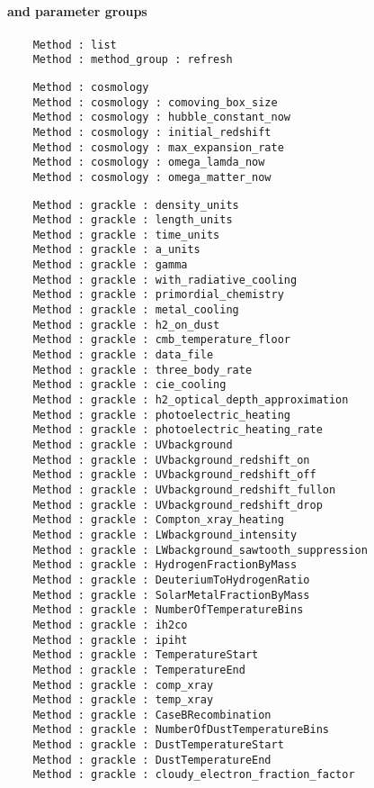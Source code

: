 \NEWSEC

\subsection{\ssParamMethod}

\begin{frame}[fragile,label=ss-param-method] 
\secframetitle{\ssParamMethod}
\framesubtitle{ and  parameter groups}

\begin{verbatim}
    Method : list
    Method : method_group : refresh
\end{verbatim}

\begin{verbatim}
    Method : cosmology
    Method : cosmology : comoving_box_size
    Method : cosmology : hubble_constant_now
    Method : cosmology : initial_redshift
    Method : cosmology : max_expansion_rate
    Method : cosmology : omega_lamda_now
    Method : cosmology : omega_matter_now
\end{verbatim}

\begin{verbatim}
    Method : grackle : density_units
    Method : grackle : length_units
    Method : grackle : time_units
    Method : grackle : a_units
    Method : grackle : gamma
    Method : grackle : with_radiative_cooling
    Method : grackle : primordial_chemistry
    Method : grackle : metal_cooling
    Method : grackle : h2_on_dust
    Method : grackle : cmb_temperature_floor
    Method : grackle : data_file
    Method : grackle : three_body_rate
    Method : grackle : cie_cooling
    Method : grackle : h2_optical_depth_approximation
    Method : grackle : photoelectric_heating
    Method : grackle : photoelectric_heating_rate
    Method : grackle : UVbackground
    Method : grackle : UVbackground_redshift_on
    Method : grackle : UVbackground_redshift_off
    Method : grackle : UVbackground_redshift_fullon
    Method : grackle : UVbackground_redshift_drop
    Method : grackle : Compton_xray_heating
    Method : grackle : LWbackground_intensity
    Method : grackle : LWbackground_sawtooth_suppression
    Method : grackle : HydrogenFractionByMass
    Method : grackle : DeuteriumToHydrogenRatio
    Method : grackle : SolarMetalFractionByMass
    Method : grackle : NumberOfTemperatureBins
    Method : grackle : ih2co
    Method : grackle : ipiht
    Method : grackle : TemperatureStart
    Method : grackle : TemperatureEnd
    Method : grackle : comp_xray
    Method : grackle : temp_xray
    Method : grackle : CaseBRecombination
    Method : grackle : NumberOfDustTemperatureBins
    Method : grackle : DustTemperatureStart
    Method : grackle : DustTemperatureEnd
    Method : grackle : cloudy_electron_fraction_factor
\end{verbatim}


\end{frame}
